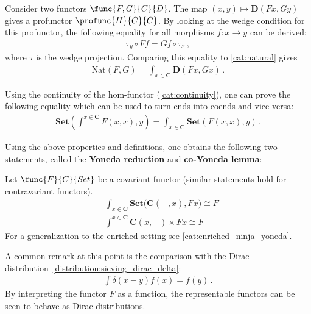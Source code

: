     \begin{example}
        Consider two functors $\func{F,G}{C}{D}$. The map $(x,y)\mapsto\mathbf{D}(Fx,Gy)$ gives a profunctor $\profunc{H}{C}{C}$. By looking at the wedge condition for this profunctor, the following equality for all morphisms $f:x\rightarrow y$ can be derived:
        \begin{gather}
            \tau_y\circ Ff = Gf\circ\tau_x\,,
        \end{gather}
        where $\tau$ is the wedge projection. Comparing this equality to \cref{cat:natural} gives
        \begin{gather}
            \label{cat:natural_end}
            \mathrm{Nat}(F,G) = \int_{x\in\mathbf{C}}\mathbf{D}(Fx,Gx)\,.
        \end{gather}
    \end{example}

    \begin{property}
        Using the continuity of the hom-functor (\cref{cat:continuity}), one can prove the following equality which can be used to turn ends into coends and vice versa:
        \begin{gather}
            \mathbf{Set}\left(\int^{x\in\mathbf{C}}F(x,x),y\right) = \int_{x\in\mathbf{C}}\mathbf{Set}\left(F(x,x),y\right)\,.
        \end{gather}
    \end{property}

    Using the above properties and definitions, one obtains the following two statements, called the \textbf{Yoneda reduction} and \textbf{co-Yoneda lemma}:
    \begin{property}\label{cat:ninja_yoneda}
        Let $\func{F}{C}{Set}$ be a covariant functor (similar statements hold for contravariant functors).
        \begin{align}
            &\int_{x\in\mathbf{C}}\mathbf{Set}\big(\mathbf{C}(-,x),Fx\big)\cong F\\
            &\int^{x\in\mathbf{C}}\mathbf{C}(x,-)\times Fx\cong F
        \end{align}
        For a generalization to the enriched setting see \cref{cat:enriched_ninja_yoneda}.
    \end{property}
    \begin{remark}
        A common remark at this point is the comparison with the Dirac distribution~\eqref{distribution:sieving_dirac_delta}:
        \begin{gather}
            \int \delta(x-y)f(x) = f(y)\,.
        \end{gather}
        By interpreting the functor $F$ as a function, the representable functors can be seen to behave as Dirac distributions.
    \end{remark}

